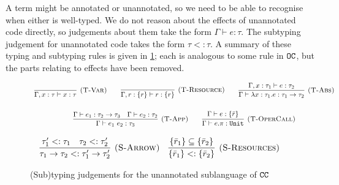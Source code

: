 A term might be annotated or unannotated, so we need to be able to recognise when either is well-typed. We do not reason about the effects of unannotated code directly, so judgements about them take the form $\Gamma \vdash e: \tau$. The subtyping judgement for unannotated code takes the form $\tau <: \tau$. A summary of these typing and subtyping rules is given in \ref{fig:unannotated_static_rules}; each is analogous to some rule in $\mathtt{OC}$, but the parts relating to effects have been removed.

\begin{figure}[h]
\vspace{-5pt}



\[
\begin{array}{c}


\infer[\textsc{(T-Var)}]
	{\Gamma, x: \tau \vdash x: \tau}
	{}
~~~~~~
\infer[\textsc{(T-Resource)}]
	{\Gamma, r: \{ r \} \vdash r : \{ r \}}
	{}

~~~~~~
\infer[\textsc{(T-Abs)}]
	{\Gamma \vdash \lambda x: \tau_1.e : \tau_1 \rightarrow \tau_2}
	{\Gamma, x: \tau_1 \vdash e: \tau_2}\\[4ex]
	
\infer[\textsc{(T-App)}]
	{\Gamma \vdash e_1~e_2: \tau_3}
	{\Gamma \vdash e_1: \tau_2 \rightarrow \tau_3 & \Gamma \vdash e_2: \tau_2}
~~~~~~
\infer[\textsc{(T-OperCall)}]
	{\Gamma \vdash e.\pi: \kwa{Unit}}
	{\Gamma \vdash e: \{ \bar r \}}

\end{array}
\]



\fbox{$\tau <: \tau$}

\[
\begin{array}{c}

\infer[\textsc{(S-Arrow)}]
	{ \tau_1 \rightarrow \tau_2 <: \tau_1' \rightarrow \tau_2' }
	{ \tau_1' <: \tau_1 & \tau_2 <: \tau_2' }
	~~~
\infer[\textsc{(S-Resources)}]
	{ \{ \bar r_1 \} <: \{ \bar r_2 \} }
	{ \{ \bar r_1 \} \subseteq \{ \bar r_2 \} }

\end{array}
\]

\vspace{-7pt}
\caption{(Sub)typing judgements for the unannotated sublanguage of $\mathtt{CC}$}
\label{fig:unannotated_static_rules}
\end{figure}



